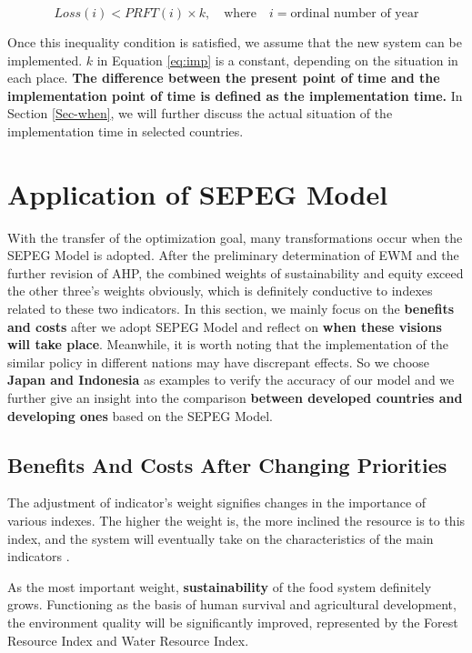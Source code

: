\documentclass{mcmthesis}
\begin{document}
\begin{equation}
\label{eq:imp}
    Loss(i)<PRFT(i) \times k, \quad \text{where} \quad i = \text{ordinal number of year}
\end{equation}

Once this inequality condition is satisfied, we assume that the new system can be implemented. $k$ in Equation \eqref{eq:imp} is a constant, depending on the situation in each place. \textbf{The difference between the present point of time and the implementation point of time is defined as the implementation time.} In Section \ref{Sec-when}, we will further discuss the actual situation of the implementation time in selected countries.


\section{Application of SEPEG Model}
\label{sec-App}
With the transfer of the optimization goal, many transformations occur when the SEPEG Model is adopted. After the preliminary determination of EWM and the further revision of AHP, the combined weights of sustainability and equity exceed the other three's weights obviously, which is definitely conductive to indexes related to these two indicators. In this section, we mainly focus on the \textbf{benefits and costs} after we adopt SEPEG Model and reflect on\textbf{ when these visions will take place}.  Meanwhile, it is worth noting that the implementation of the similar policy in different nations may have discrepant effects. So we choose \textbf{Japan and Indonesia} as examples to verify the accuracy of our model and we further give an insight into the comparison \textbf{between developed countries and developing ones} based on the SEPEG Model.

\subsection{Benefits And Costs After Changing Priorities}
\label{Sec-BeneAndCost}
The adjustment of indicator's weight signifies changes in the importance of various indexes. The higher the weight is, the more inclined the resource is to this index, and the system will eventually take on the characteristics of the main indicators \cite{reilly2010managing}. 

As the most important weight, \textbf{sustainability} of the food system definitely grows. Functioning as the basis of human survival and agricultural development, the environment quality will be significantly improved, represented by the Forest Resource Index and Water Resource Index. 
\end{document}

